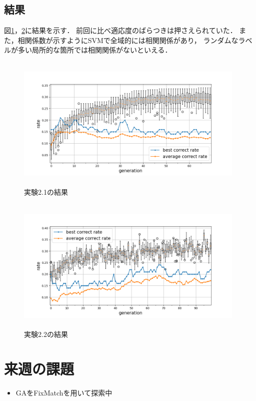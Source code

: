 \documentclass[twocolumn]{jarticle}     %
\begin{document}
\subsection{結果}
図\ref{fig:ex1}，\ref{fig:ex2}に結果を示す．
前回に比べ適応度のばらつきは押さえられていた．
また，相関係数が示すようにSVMで全域的には相関関係があり，
ランダムなラベルが多い局所的な箇所では相関関係がないといえる．


\begin{figure}[h]
	\begin{center}
		\vspace*{-7mm}
		\hspace*{-8mm}
		\includegraphics[height=65mm,width=110mm]{graph_1.png}
		\caption{実験2.1の結果\label{fig:ex1}}
	\end{center}
\end{figure}

\begin{figure}[h]
	\begin{center}
		\vspace*{-7mm}
		\hspace*{-8mm}
		\includegraphics[height=65mm,width=110mm]{graph_2.png}
		\caption{実験2.2の結果\label{fig:ex2}}
	\end{center}
\end{figure}

\section{来週の課題}
	\begin{itemize}
		\item GAをFixMatchを用いて探索中
	\end{itemize}
\end{document}
